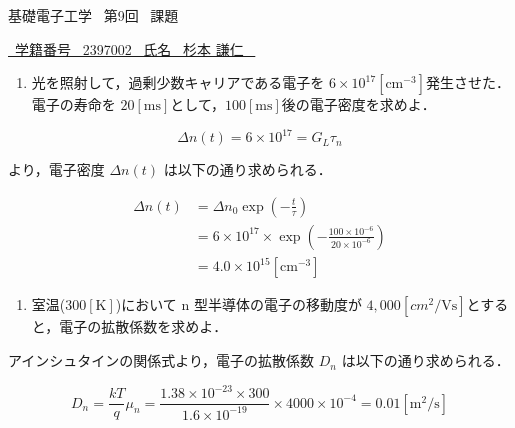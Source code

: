 \documentclass{classes/report}
\begin{document}
基礎電子工学 \ 第9回 \ 課題
\begin{flushright}
    \underline{\ 学籍番号 \ 2397002 \ 氏名 \ 杉本 謙仁 \ }
\end{flushright}

\bigskip

\begin{enumerate}
    \item 光を照射して，過剰少数キャリアである電子を $6 \times 10^{17} [\mathrm{cm}^{-3}]$発生させた．電子の寿命を $20 [\mathrm{ms}]$として，$100 [\mathrm{ms}]$後の電子密度を求めよ．
\end{enumerate}

\begin{equation}
    \Delta n(t) = 6 \times 10^{17} = G_{L} \tau_{n}
\end{equation}

より，電子密度 $\Delta n(t)$ は以下の通り求められる．

\begin{equation}
    \begin{split}
        \Delta n(t) &= \Delta n_0 \exp\left(-\frac{t}{\tau}\right) \\
        &= 6 \times 10^{17} \times \exp\left(-\frac{100 \times 10^{-6}}{20 \times 10^{-6}}\right) \\
        &= 4.0 \times 10^{15} [\mathrm{cm}^{-3}]
    \end{split}
\end{equation}

\bigskip

\begin{enumerate}[resume]
    \item 室温($300 [\mathrm{K}]$)において n 型半導体の電子の移動度が $4,000[cm^{2}/\mathrm{Vs}]$とすると，電子の拡散係数を求めよ．
\end{enumerate}

アインシュタインの関係式より，電子の拡散係数 $D_{n}$ は以下の通り求められる．

\begin{equation}
    D_{n} = \frac{kT}{q}\mu_{n} = \frac{1.38 \times 10^{-23} \times 300}{1.6 \times 10^{-19}}\times 4000 \times 10^{-4} = 0.01 [\mathrm{m}^{2}/\mathrm{s}]
\end{equation}
\end{document}
